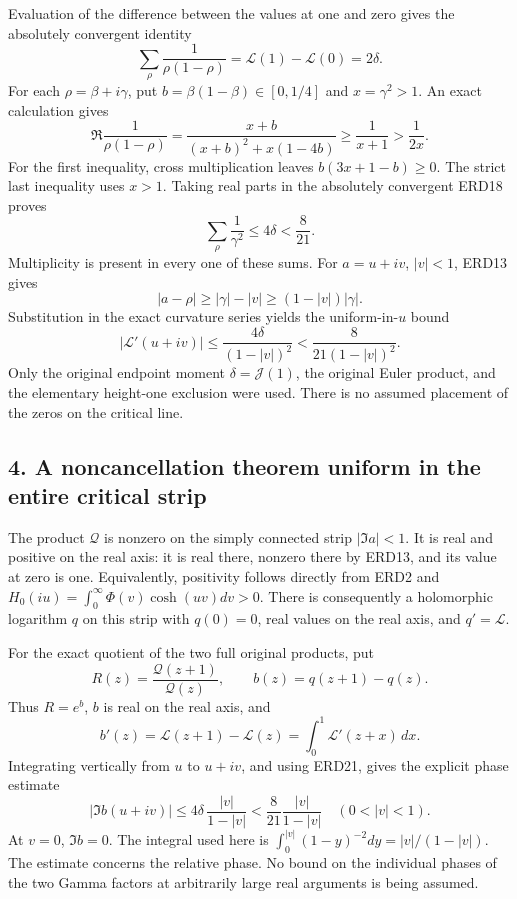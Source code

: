 \documentclass[
  10pt,
  a4paper,
]{article}
\begin{document}
Evaluation of the difference between the values at one and zero gives
the absolutely convergent identity \[
 \sum_\rho\frac1{\rho(1-\rho)}
       =\mathcal L(1)-\mathcal L(0)=2\delta.
 \tag{ERD18}
\] For each \(\rho=\beta+i\gamma\), put \(b=\beta(1-\beta)\in[0,1/4]\)
and \(x=\gamma^2>1\). An exact calculation gives \[
 \Re\frac1{\rho(1-\rho)}
  =\frac{x+b}{(x+b)^2+x(1-4b)}
  \ge\frac1{x+1}>\frac1{2x}.
 \tag{ERD19}
\] For the first inequality, cross multiplication leaves
\(b(3x+1-b)\ge0\). The strict last inequality uses \(x>1\). Taking real
parts in the absolutely convergent ERD18 proves \[
 \boxed{\displaystyle
       \sum_\rho\frac1{\gamma^2}\le4\delta<\frac8{21}.}
 \tag{ERD20}
\] Multiplicity is present in every one of these sums. For \(a=u+iv\),
\(|v|<1\), ERD13 gives \[
 |a-\rho|\ge|\gamma|-|v|
             \ge(1-|v|)|\gamma|.
\] Substitution in the exact curvature series yields the
uniform-in-\(u\) bound \[
 \boxed{\displaystyle
 |\mathcal L'(u+iv)|
       \le\frac{4\delta}{(1-|v|)^2}
       <\frac{8}{21(1-|v|)^2}.}
 \tag{ERD21}
\] Only the original endpoint moment \(\delta=\mathcal J(1)\), the
original Euler product, and the elementary height-one exclusion were
used. There is no assumed placement of the zeros on the critical line.

\subsection{4. A noncancellation theorem uniform in the entire critical
strip}\label{a-noncancellation-theorem-uniform-in-the-entire-critical-strip}

The product \(\mathcal Q\) is nonzero on the simply connected strip
\(|\Im a|<1\). It is real and positive on the real axis: it is real
there, nonzero there by ERD13, and its value at zero is one.
Equivalently, positivity follows directly from ERD2 and
\(H_0(iu)=\int_0^\infty\Phi(v)\cosh(uv)dv>0\). There is consequently a
holomorphic logarithm \(q\) on this strip with \(q(0)=0\), real values
on the real axis, and \(q'=\mathcal L\).

For the exact quotient of the two full original products, put \[
 R(z)=\frac{\mathcal Q(z+1)}{\mathcal Q(z)},\qquad
 b(z)=q(z+1)-q(z).
 \tag{ERD22}
\] Thus \(R=e^b\), \(b\) is real on the real axis, and \[
 b'(z)=\mathcal L(z+1)-\mathcal L(z)
                   =\int_0^1\mathcal L'(z+x)\,dx .
\] Integrating vertically from \(u\) to \(u+iv\), and using ERD21, gives
the explicit phase estimate \[
 \boxed{\displaystyle
 |\Im b(u+iv)|
 \le4\delta\,\frac{|v|}{1-|v|}
 <\frac8{21}\frac{|v|}{1-|v|}
       \quad(0<|v|<1).}
 \tag{ERD23}
\] At \(v=0\), \(\Im b=0\). The integral used here is
\(\int_0^{|v|}(1-y)^{-2}dy=|v|/(1-|v|)\). The estimate concerns the
relative phase. No bound on the individual phases of the two Gamma
factors at arbitrarily large real arguments is being assumed.
\end{document}
